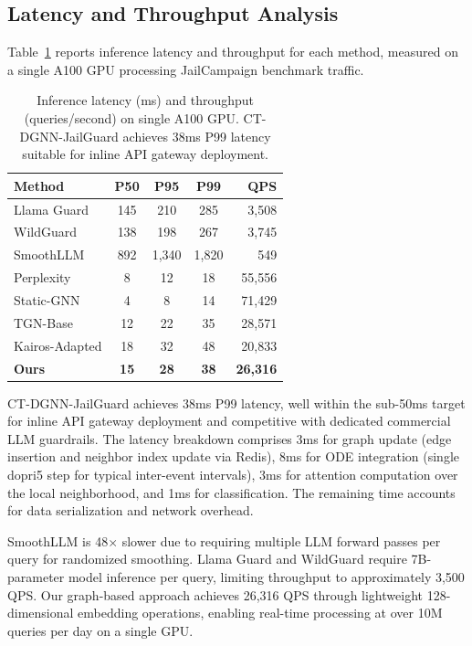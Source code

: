 \documentclass[journal]{IEEEtran}
\theoremstyle{plain}
\theoremstyle{definition}
\theoremstyle{remark}
\begin{document}
\subsection{Latency and Throughput Analysis}

Table~\ref{tab:latency} reports inference latency and throughput for each method, measured on a single A100 GPU processing JailCampaign benchmark traffic.

\begin{table}[t]
\centering
\caption{Inference latency (ms) and throughput (queries/second) on single A100 GPU. CT-DGNN-JailGuard achieves 38ms P99 latency suitable for inline API gateway deployment.}
\label{tab:latency}
\begin{tabular}{@{}lcccr@{}}
\toprule
\textbf{Method} & \textbf{P50} & \textbf{P95} & \textbf{P99} & \textbf{QPS} \\
\midrule
Llama Guard & 145 & 210 & 285 & 3,508 \\
WildGuard & 138 & 198 & 267 & 3,745 \\
SmoothLLM & 892 & 1,340 & 1,820 & 549 \\
Perplexity & 8 & 12 & 18 & 55,556 \\
Static-GNN & 4 & 8 & 14 & 71,429 \\
TGN-Base & 12 & 22 & 35 & 28,571 \\
Kairos-Adapted & 18 & 32 & 48 & 20,833 \\
\textbf{Ours} & \textbf{15} & \textbf{28} & \textbf{38} & \textbf{26,316} \\
\bottomrule
\end{tabular}
\end{table}

CT-DGNN-JailGuard achieves 38ms P99 latency, well within the sub-50ms target for inline API gateway deployment and competitive with dedicated commercial LLM guardrails. The latency breakdown comprises 3ms for graph update (edge insertion and neighbor index update via Redis), 8ms for ODE integration (single dopri5 step for typical inter-event intervals), 3ms for attention computation over the local neighborhood, and 1ms for classification. The remaining time accounts for data serialization and network overhead.

SmoothLLM is 48$\times$ slower due to requiring multiple LLM forward passes per query for randomized smoothing. Llama Guard and WildGuard require 7B-parameter model inference per query, limiting throughput to approximately 3,500 QPS. Our graph-based approach achieves 26,316 QPS through lightweight 128-dimensional embedding operations, enabling real-time processing at over 10M queries per day on a single GPU.
\end{document}

